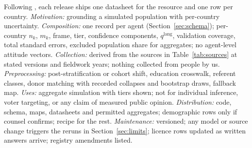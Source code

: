 \documentclass[10pt]{article}
\begin{document}
Following \citet{gebru2021}, each release ships one datasheet for the resource and one row per country. \emph{Motivation:} grounding a simulated population with per-country uncertainty. \emph{Composition:} one record per agent (Section~\ref{sec:schema}); per-country $n_k$, $m_k$, frame, tier, confidence components, $q^{\text{lang}}$, validation coverage, total standard errors, excluded population share for aggregates; no agent-level attitude vectors. \emph{Collection:} derived from the sources in Table~\ref{tab:sources} at stated versions and fieldwork years; nothing collected from people by us. \emph{Preprocessing:} post-stratification or cohort shift, education crosswalk, referent classes, donor matching with recorded collapses and bootstrap draws, fallback map. \emph{Uses:} aggregate simulation with tiers shown; not for individual inference, voter targeting, or any claim of measured public opinion. \emph{Distribution:} code, schema, maps, datasheets and permitted aggregates; demographic rows only if counsel confirms; recipe for the rest. \emph{Maintenance:} versioned; any model or source change triggers the reruns in Section~\ref{sec:limits}; licence rows updated as written answers arrive; registry amendments listed.

{\raggedright


}
\end{document}
